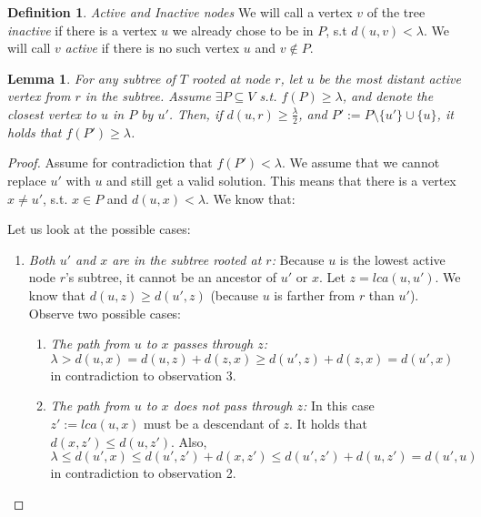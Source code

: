 \documentclass[11pt,a4paper]{article}
\newtheorem{lemma}{Lemma}
\theoremstyle{definition}
\newtheorem{definition}{Definition}
\theoremstyle{remark}
\begin{document}
\begin{definition}
\emph{Active and Inactive nodes} We will call a vertex $v$ of the tree \emph{inactive} if there is a vertex $u$ we already chose to be in $P$, s.t $d(u,v)<\lambda$. We will call $v$ \emph{active} if there is no such vertex $u$ and $v \notin P$.
\end{definition}
\begin{lemma} \label{greenNodesLemma}
For any subtree of $T$ rooted at node $r$, let $u$ be the most distant active vertex from $r$ in the subtree. Assume $\exists P \subseteq V$ s.t. $f(P)\geq\lambda$, and denote the closest vertex to $u$ in $P$ by $u'$. Then, if $d(u,r)\ge\frac{\lambda}{2}$, and $P' := P \setminus \lbrace u' \rbrace \cup \lbrace u \rbrace$, it holds that $f(P')\geq\lambda$.
\end{lemma}
\begin{proof}
Assume for contradiction that $f(P')<\lambda$. We assume that we cannot replace $u'$ with $u$ and still get a valid solution. This means that there is a vertex $x \neq u'$, s.t. $x\in P$ and $d(u,x)<\lambda$. 
We know that:
\\ {\normalfont Let us look at the possible cases:
\begin{enumerate}
\item \textit{Both $u'$ and $x$ are in the subtree rooted at $r$:}
Because $u$ is the lowest active node $r$'s subtree, it cannot be an ancestor of $u'$ or $x$.
Let $z=lca(u,u')$. We know that $d(u,z)\geq d(u',z)$ (because $u$ is farther from $r$ than $u'$). Observe two possible cases:
\begin{enumerate}
\item \emph{The path from $u$ to $x$ passes through $z$:}
$\lambda> d(u,x) = d(u,z) + d(z,x) \geq d(u',z)+d(z,x) = d(u',x)$ in contradiction to observation 3.
\item \emph{The path from $u$ to $x$ does not pass through $z$:}
In this case $z':=lca(u,x)$ must be a descendant of $z$. It holds that $d(x,z')\leq d(u,z')$.
Also, $\lambda \leq d(u',x) \leq d(u',z')+d(x,z') \leq d(u',z')+d(u,z') = d(u',u)$ in contradiction to observation 2.
\end{enumerate}


\end{enumerate}}
\end{proof}
\end{document}
